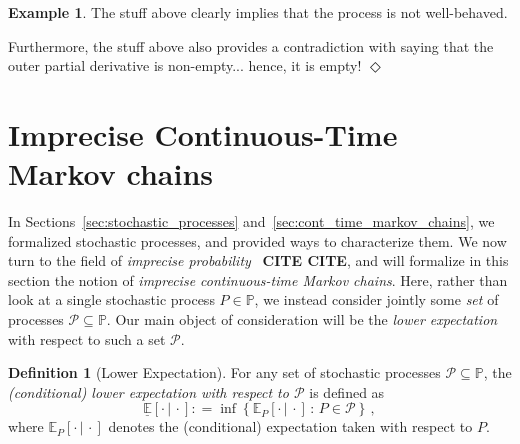 \documentclass[10pt,a4paper]{paper}
\theoremstyle{definition}
\newtheorem{exmp}{Example}%
\newtheorem{proposition}[theorem]{Proposition}
\newtheorem{definition}{Definition}
\newcommand{\reals}{\mathbb{R}}
\newcommand{\realsnonneg}{\reals_{\geq 0}}
\newcommand{\processes}{\mathbb{P}}
\newcommand{\wmprocesses}{\processes^{\mathrm{WM}}}
\newcommand{\coloneqq}{:\!=}
\newcommand{\exampleend}{\hfill$\Diamond$}
\begin{document}
\begin{exmp}
The stuff above clearly implies that the process is not well-behaved.

Furthermore, the stuff above also provides a contradiction with saying that the outer partial derivative is non-empty... hence, it is empty!
\exampleend
\end{exmp}







\section{Imprecise Continuous-Time Markov chains}
\label{sec:iCTMC}

In Sections~\ref{sec:stochastic_processes} and~\ref{sec:cont_time_markov_chains}, we formalized stochastic processes, and provided ways to characterize them. We now turn to the field of \emph{imprecise probability}~\cite{Walley:1991vk} {\bf CITE CITE}, and will formalize in this section the notion of \emph{imprecise continuous-time Markov chains}. Here, rather than look at a single stochastic process $P\in\processes$, we instead consider jointly some \emph{set} of processes $\mathcal{P}\subseteq\processes$. Our main object of consideration will be the \emph{lower expectation} with respect to such a set $\mathcal{P}$.

\begin{definition}[Lower Expectation]\label{def:lower_exp}
For any set of stochastic processes $\mathcal{P}\subseteq\processes$, the \emph{(conditional) lower expectation with respect to $\mathcal{P}$} is defined as
\begin{equation*}
\underline{\mathbb{E}}[\cdot\,\vert\,\cdot] \coloneqq \inf\left\{\mathbb{E}_P[\cdot\,\vert\,\cdot]\,:\,P\in\mathcal{P}\right\}\,,
\end{equation*}
where $\mathbb{E}_P[\cdot\,\vert\,\cdot]$ denotes the (conditional) expectation taken with respect to $P$.
\vspace{0pt}
\end{definition}
\end{document}
